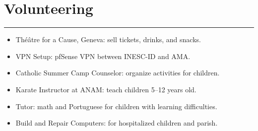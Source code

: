 \documentclass[11pt,a4paper]{article}
\begin{document}
\section*{Volunteering}

\hrule

\begin{itemize}[noitemsep]
    \item Théâtre for a Cause, Geneva: sell tickets, drinks, and snacks.
    \item VPN Setup: pfSense VPN between INESC-ID and AMA\@.
    \item Catholic Summer Camp Counselor: organize activities for children.
    \item Karate Instructor at ANAM\@: teach children 5--12 years old.
    \item Tutor: math and Portuguese for children with learning difficulties.
    \item Build and Repair Computers: for hospitalized children and parish.
\end{itemize}
\end{document}
